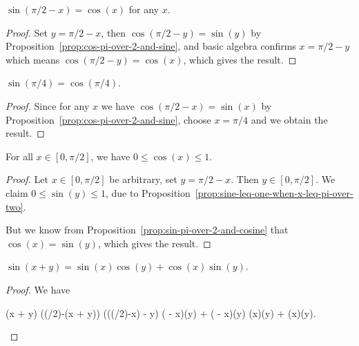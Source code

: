 \begin{proposition}\label{prop:sin-pi-over-2-and-cosine}
$\sin(\pi/2 - x) = \cos(x)$ for any $x$.
\end{proposition}
\begin{proof}
Set $y = \pi/2 - x$, then $\cos(\pi/2 - y) = \sin(y)$ by
Proposition~\ref{prop:cos-pi-over-2-and-sine}, and basic algebra
confirms $x = \pi/2 - y$ which means $\cos(\pi/2 - y) = \cos(x)$,
which gives the result.
\end{proof}

\begin{proposition}\label{prop:sine-pi-over-four-equals-cosine-pi-over-four}
$\sin(\pi/4) = \cos(\pi/4)$.
\end{proposition}
\begin{proof}
Since for any $x$ we have $\cos(\pi/2 - x) = \sin(x)$ by Proposition~\ref{prop:cos-pi-over-2-and-sine}, choose $x=\pi/4$ and we obtain the result.
\end{proof}

\begin{proposition}\label{prop:cosine-is-positive-on-0-to-pi-over-2}
For all $x\in[0,\pi/2]$, we have $0\leq \cos(x)\leq 1$.
\end{proposition}
\begin{proof}
  Let $x\in[0,\pi/2]$ be arbitrary, set $y=\pi/2-x$. Then $y\in[0,\pi/2]$.
  We claim $0\leq\sin(y)\leq 1$, due to Proposition~\ref{prop:sine-leq-one-when-x-leq-pi-over-two}.

  But we know from Proposition~\ref{prop:sin-pi-over-2-and-cosine} that
  $\cos(x)=\sin(y)$, which gives the result.
\end{proof}

\begin{proposition}\label{prop:sine-of-sum}
$\sin(x + y) = \sin(x)\cos(y) + \cos(x)\sin(y)$.
\end{proposition}
\begin{proof}
We have
\begin{calculation}
\sin(x + y)
\cos((\pi/2)-(x + y))
\cos\left(\bigl((\pi/2)-x\bigr) - y\right)
\cos\left( - x\right)\cos(y) + \sin\left( - x\right)\sin(y)
\sin(x)\cos(y) + \cos(x)\sin(y).\qedhere
\end{calculation}
\end{proof}

